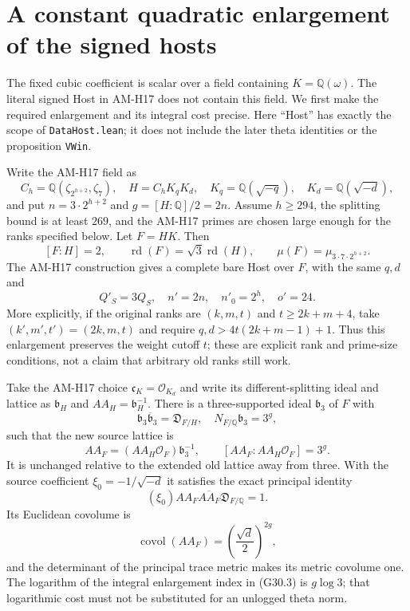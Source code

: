 \section{A constant quadratic enlargement of the signed hosts}
\label{sec:mixed-host-interface}

The fixed cubic coefficient is scalar over a field containing
$K=\mathbb Q(\omega)$.  The literal signed Host in AM-H17 does
not contain this field.  We first make the required enlargement
and its integral cost precise.  Here ``Host'' has exactly the
scope of \texttt{DataHost.lean}; it does not include the later
theta identities or the proposition \texttt{VWin}.

\begin{proposition}
\label{AC-G30}
Write the AM-H17 field as
\[
 C_h=\mathbb Q(\zeta_{2^{h+2}},\zeta_7),\quad
 H=C_hK_qK_d,\quad K_q=\mathbb Q(\sqrt{-q}),\quad
 K_d=\mathbb Q(\sqrt{-d}),
\]
and put $n=3\cdot2^{h+2}$ and $g=[H:\mathbb Q]/2=2n$.
Assume $h\geq294$, the splitting bound is at least $269$,
and the AM-H17 primes are chosen large enough for the ranks
specified below.  Let $F=HK$.  Then
\[
 [F:H]=2,\qquad
 \operatorname{rd}(F)=\sqrt3\operatorname{rd}(H),
 \qquad \mu(F)=\mu_{3\cdot7\cdot2^{h+2}}.             \tag{G30.1}
\]
The AM-H17 construction gives a complete bare Host over $F$,
with the same $q,d$ and
\[
 Q'_S=3Q_S,\quad n'=2n,\quad n'_0=2^h,\quad o'=24.
                                                               \tag{G30.2}
\]
More explicitly, if the original ranks are $(k,m,t)$ and
$t\geq2k+m+4$, take $(k',m',t')=(2k,m,t)$ and require
$q,d>4t(2k+m-1)+1$.  Thus this enlargement preserves the
weight cutoff $t$; these are explicit rank and prime-size
conditions, not a claim that arbitrary old ranks still work.

Take the AM-H17 choice $\mathfrak c_K=\mathcal O_{K_d}$ and
write its different-splitting ideal and lattice as
$\mathfrak b_H$ and $AA_H=\mathfrak b_H^{-1}$.
There is a three-supported ideal $\mathfrak b_3$ of $F$ with
\[
 \mathfrak b_3\overline{\mathfrak b}_3
       =\mathfrak D_{F/H},\quad
 N_{F/\mathbb Q}\mathfrak b_3=3^g,
\]
such that the new source lattice is
\[
 AA_F=(AA_H\mathcal O_F)\mathfrak b_3^{-1},\qquad
 [AA_F:AA_H\mathcal O_F]=3^g.                         \tag{G30.3}
\]
It is unchanged relative to the extended old lattice away
from three.  With the source coefficient
$\xi_0=-1/\sqrt{-d}$ it satisfies the exact principal identity
\[
 (\xi_0)AA_F\overline{AA_F}\mathfrak D_{F/\mathbb Q}=1.
                                                               \tag{G30.4}
\]
Its Euclidean covolume is
\[
 \operatorname{covol}(AA_F)
       =\left(\frac{\sqrt d}{2}\right)^{2g},           \tag{G30.5}
\]
and the determinant of the principal trace metric makes its
metric covolume one.  The logarithm of the integral enlargement
index in (G30.3) is $g\log3$; that logarithmic cost must not be
substituted for an unlogged theta norm.


\end{proposition}
